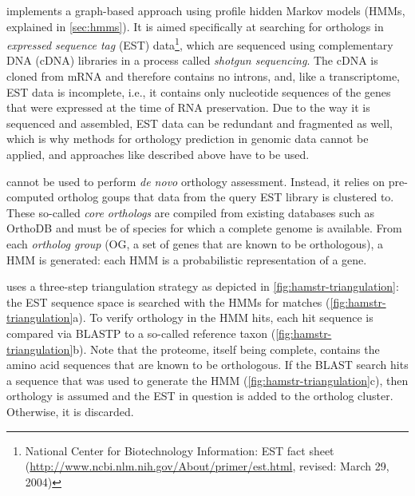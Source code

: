 \hamstr implements a graph-based approach using profile hidden Markov models
(HMMs, explained in \autoref{sec:hmms}). It is aimed specifically at
searching for orthologs in \emph{expressed sequence tag} (EST)
data\footnote{National Center for Biotechnology Information: EST fact sheet
(\url{http://www.ncbi.nlm.nih.gov/About/primer/est.html}, revised: March 29,
2004)}, which are sequenced using complementary DNA (cDNA) libraries in a
process called \emph{shotgun sequencing}. The cDNA is cloned from mRNA and
therefore contains no introns, and, like a transcriptome, EST data is
incomplete, i.e., it contains only nucleotide sequences of the genes that were
expressed at the time of RNA preservation. Due to the way it is sequenced and
assembled, EST data can be redundant and fragmented as well, which is why
methods for orthology prediction in genomic data cannot be applied, and
approaches like described above have to be used.

\hamstr cannot be used to perform \emph{de novo} orthology assessment. Instead,
it relies on pre-computed ortholog goups that data from the query EST library is
clustered to. These so-called \emph{core orthologs} are compiled from
existing databases such as OrthoDB and must be of species for which a complete
genome is available. From each \emph{ortholog group} (OG, a set of genes that are
known to be orthologous), a HMM is generated: each HMM is a probabilistic
representation of a gene. 

\hamstr uses a three-step triangulation strategy as depicted in
\autoref{fig:hamstr-triangulation}: the EST sequence space is searched with the
HMMs for matches (\autoref{fig:hamstr-triangulation}a). To verify orthology in
the HMM hits, each hit sequence is compared via BLASTP \citep{altschul1997} to a
so-called reference taxon (\autoref{fig:hamstr-triangulation}b). Note that the
proteome, itself being complete, contains the amino acid sequences that are
known to be orthologous. If the BLAST search hits a sequence that was used to
generate the HMM (\autoref{fig:hamstr-triangulation}c), then orthology is
assumed and the EST in question is added to the ortholog cluster. Otherwise, it
is discarded.



%

